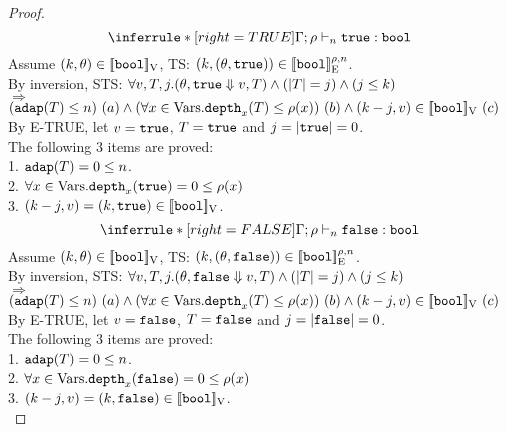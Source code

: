 \documentclass[a4paper,11pt]{article}
\theoremstyle{definition}
\begin{document}
\begin{proof}
\[
    \inferrule*[right = TRUE]{
    }{
      \Gamma; \dmap \tvdash{\nnatA} \etrue: \tbool
    }
\]
Assume $ (k, \theta) \in [\![ \mathtt{bool} ]\!]_{\text{V}} $, TS: $(k, (\theta, \mathtt{true})) \in [\![ \mathtt{bool} ]\!]_{\text{E}}^{\rho, n}$.\\
%
By inversion, STS: $\forall v, T, j. (\theta, \mathtt{true} \mathrel{\Downarrow} v, T) \land (|T| = j) \land (j \leq k) $\\
$\Rightarrow$ 
$ (\mathtt{adap}(T) \leq n) ~ (a) 
\land (\forall x \in \mbox{Vars}. \mathtt{depth}_{x}(T) \leq \rho(x)) ~ (b)
\land (k - j, v) \in [\![ \mathtt{bool} ]\!]_{\text{V}} ~ (c)$\\
%
By E-TRUE, let $v = \mathtt{true}$, $T = \mathtt{true}$ and $j = |\mathtt{true}| = 0$.\\
%
The following 3 items are proved:\\
%
1. $\mathtt{adap}(T) = 0 \leq n$.\\
2. $\forall x \in \mbox{Vars}. \mathtt{depth}_{x}(\mathtt{true}) = 0 \leq \rho(x)$\\
3. $(k - j, v) = (k, \mathtt{true}) \in [\![ \mathtt{bool} ]\!]_{\text{V}}$.\\



\[
    \inferrule*[right = FALSE]{
    }{
      \Gamma; \dmap \tvdash{\nnatA} \efalse: \tbool
    }
\]
Assume $ (k, \theta) \in [\![ \mathtt{bool} ]\!]_{\text{V}} $, TS: $(k, (\theta, \mathtt{false})) \in [\![ \mathtt{bool} ]\!]_{\text{E}}^{\rho, n}$.\\
%
By inversion, STS: $\forall v, T, j. (\theta, \mathtt{false} \mathrel{\Downarrow} v, T) \land (|T| = j) \land (j \leq k) $\\
$\Rightarrow$ 
$ (\mathtt{adap}(T) \leq n) ~ (a) 
\land (\forall x \in  \mbox{Vars}. \mathtt{depth}_{x}(T) \leq \rho(x)) ~ (b)
\land (k - j, v) \in [\![ \mathtt{bool} ]\!]_{\text{V}} ~ (c)$\\
%
By E-TRUE, let $v = \mathtt{false}$, $T = \mathtt{false}$ and $j = |\mathtt{false}| = 0$.\\
%
The following 3 items are proved:\\
%
1. $\mathtt{adap}(T) = 0 \leq n$.\\
2. $\forall x \in \mbox{Vars}. \mathtt{depth}_{x}(\mathtt{false}) = 0 \leq \rho(x)$\\
3. $(k - j, v) = (k, \mathtt{false}) \in [\![ \mathtt{bool} ]\!]_{\text{V}}$.\\



\end{proof}
\end{document}
